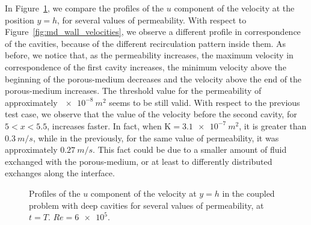 In Figure~\ref{fig:md_wall_velocities_deep}, we compare the profiles of the $u$ component of the velocity at the position $y=h$, for several values of permeability. With respect to Figure~\ref{fig:md_wall_velocities}, we observe a different profile in correspondence of the cavities, because of the different recirculation pattern inside them. As before, we notice that, as the permeability increases, the maximum velocity in correspondence of the first cavity increases, the minimum velocity above the beginning of the porous-medium decreases and the velocity above the end of the porous-medium increases. The threshold value for the permeability of approximately $\SI{e-8}{m^2}$ seems to be still valid. With respect to the previous test case, we observe that the value of the velocity before the second cavity, for $5 < x < 5.5$, increases faster. In fact, when $\mathrm{K} = \SI{3.1e-7}{m^2}$, it is greater than $\SI{0.3}{m/s}$, while in the previously, for the same value of permeability, it was approximately $\SI{0.27}{m/s}$. This fact could be due to a smaller amount of fluid exchanged with the porous-medium, or at least to differently distributed exchanges along the interface.
\begin{figure}
	\centering
	
	\caption[Profiles of the $u$ component of the velocity at $y=h$ in the coupled problem with deep cavities]{Profiles of the $u$ component of the velocity at $y=h$ in the coupled problem with deep cavities for several values of permeability, at $t=T$. $Re = \num{6e5}$.}
	\label{fig:md_wall_velocities_deep}
\end{figure}

